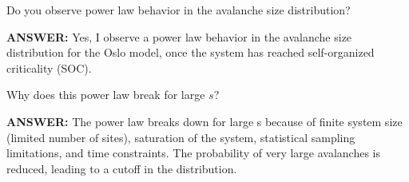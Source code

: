 \documentclass[10pt,letterpaper, onecolumn]{report}
\begin{document}
\begin{flushleft}
\begin{enumerate}
            \clearpage

            Do you observe power law behavior in the avalanche size distribution?
            \hfill\break

            \hspace{1.5em}\textbf{ANSWER:} Yes, I observe a power law behavior in the avalanche size distribution for the Oslo model, once the system has reached self-organized criticality (SOC).
            \hfill\break

            Why does this power law break for large $s$?
            \hfill\break

            \hspace{1.5em}\textbf{ANSWER:} The power law breaks down for large s because of finite system size (limited number of sites), saturation of the system, statistical sampling limitations, and time constraints. The probability of very large avalanches is reduced, leading to a cutoff in the distribution.

            \hfill\break
        \end{enumerate}
        \end{flushleft}
\end{document}
